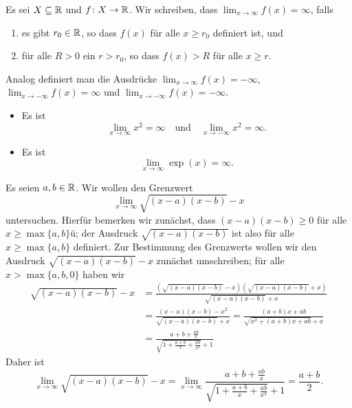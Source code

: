 \documentclass[a4paper,10pt]{article}
\begin{document}
\begin{defi}
 Es sei $X \subseteq \mathbb{R}$ und $f \colon X \to \mathbb{R}$. Wir schreiben, dass $\lim_{x \to \infty} f(x) = \infty$, falls
 \begin{enumerate}
  \item
   es gibt $r_0 \in \mathbb{R}$, so dass $f(x)$ für alle $x \geq r_0$ definiert ist, und
  \item
   für alle $R > 0$ ein $r > r_0$, so dass $f(x) > R$ für alle $x \geq r$.
 \end{enumerate}
 Analog definiert man die Ausdrücke $\lim_{x \to \infty} f(x) = -\infty$, $\lim_{x \to -\infty} f(x) = \infty$ und $\lim_{x \to -\infty} f(x) = -\infty$. 
\end{defi}


\begin{bsp}
 \begin{itemize}
  \item
   Es ist
   \[
    \lim_{x \to \infty} x^2 = \infty
    \quad
    \text{und}
    \quad
    \lim_{x \to -\infty} x^2 = \infty.
   \]
  \item
   Es ist
   \[
    \lim_{x \to \infty} \exp(x) = \infty.
   \]
 \end{itemize}
\end{bsp}

\begin{bsp}
 Es seien $a,b \in \mathbb{R}$. Wir wollen den Grenzwert 
 \[
  \lim_{x \to \infty} \sqrt{(x-a)(x-b)}-x
 \]
 untersuchen. Hierfür bemerken wir zunächst, dass $(x-a)(x-b) \geq 0$ für alle \mbox{$x \geq \max\{a,b\}$}ü; der Ausdruck $\sqrt{(x-a)(x-b)}$ ist also für alle $x \geq \max\{a,b\}$ definiert. Zur Bestimmung des Grenzwerts wollen wir den Ausdruck $\sqrt{(x-a)(x-b)}-x$ zunächst umschreiben; für alle $x > \max\{a,b,0\}$ haben wir
 \begin{align*}
  \sqrt{(x-a)(x-b)}-x
  &= \frac{(\sqrt{(x-a)(x-b)}-x)(\sqrt{(x-a)(x-b)}+x)}{\sqrt{(x-a)(x-b)}+x} \\
  &= \frac{(x-a)(x-b)-x^2}{\sqrt{(x-a)(x-b)}+x}
  = \frac{(a+b)x + ab}{\sqrt{x^2+(a+b)x+ab}+x} \\
  &= \frac{a+b+\frac{ab}{x}}{\sqrt{1+\frac{a+b}{x}+\frac{ab}{x^2}}+1}
 \end{align*}
 Daher ist
 \[
  \lim_{x \to \infty} \sqrt{(x-a)(x-b)}-x
  = \lim_{x \to \infty} \frac{a+b+\frac{ab}{x}}{\sqrt{1+\frac{a+b}{x}+\frac{ab}{x^2}}+1}
  = \frac{a+b}{2}.
 \]
\end{bsp}
\end{document}
